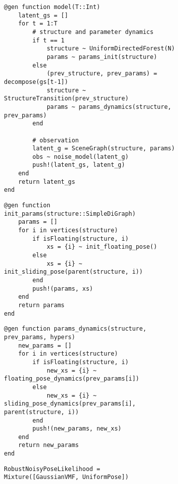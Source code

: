 \begin{figure}[H]
\centering
\begin{subfigure}{\textwidth}
\begin{lstlisting}
@gen function model(T::Int)
    latent_gs = []
    for t = 1:T
        # structure and parameter dynamics
        if t == 1
            structure ~ UniformDirectedForest(N)
            params ~ params_init(structure)
        else
            (prev_structure, prev_params) = decompose(gs[t-1])
            structure ~ StructureTransition(prev_structure)
            params ~ params_dynamics(structure, prev_params)
        end

        # observation
        latent_g = SceneGraph(structure, params)
        obs ~ noise_model(latent_g)
        push!(latent_gs, latent_g)
    end
    return latent_gs
end
\end{lstlisting}
\end{subfigure}

\begin{subfigure}{\textwidth}
\begin{lstlisting}
@gen function init_params(structure::SimpleDiGraph)
    params = []
    for i in vertices(structure)
        if isFloating(structure, i)
            xs = {i} ~ init_floating_pose()
        else
            xs = {i} ~ init_sliding_pose(parent(structure, i))
        end
        push!(params, xs)
    end
    return params
end
\end{lstlisting}
\end{subfigure}

\begin{subfigure}{\textwidth}
\begin{lstlisting}
@gen function params_dynamics(structure, prev_params, hypers)
    new_params = []
    for i in vertices(structure)
        if isFloating(structure, i)
            new_xs = {i} ~ floating_pose_dynamics(prev_params[i])
        else
            new_xs = {i} ~ sliding_pose_dynamics(prev_params[i], parent(structure, i))
        end
        push!(new_params, new_xs)
    end
    return new_params
end
\end{lstlisting}
\end{subfigure}

\begin{subfigure}{\textwidth}
\begin{lstlisting}
RobustNoisyPoseLikelihood = Mixture([GaussianVMF, UniformPose])


\end{lstlisting}
\end{subfigure}
\end{figure}
